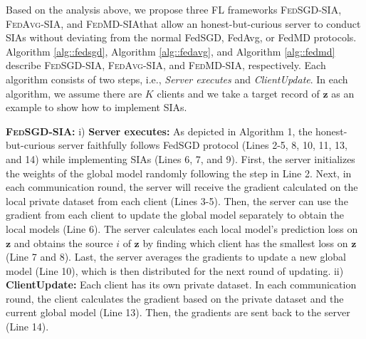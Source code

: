 \documentclass[10pt,journal,compsoc]{IEEEtran}
\newcommand*\fedavg{\textsc{FedAvg-SIA}}
\newcommand*\fedsgd{\textsc{FedSGD-SIA}}
\newcommand*\fedmd{\textsc{FedMD-SIA}}
\begin{document}
Based on the analysis above, we propose three FL frameworks \fedsgd, \fedavg, and \fedmd \;that allow an honest-but-curious server to conduct SIAs without deviating from the normal FedSGD, FedAvg, or FedMD protocols. 
Algorithm \ref{alg::fedsgd}, Algorithm \ref{alg::fedavg}, and Algorithm \ref{alg::fedmd} describe \fedsgd, \fedavg, and \fedmd, respectively. Each algorithm consists of two steps, {i.e.,} \textit{Server executes} and \textit{ClientUpdate}. In each algorithm, we assume there are $K$ clients and we take a target record of $\bm{z}$ as an example to show how to implement SIAs.


\noindent \textbf{\fedsgd: \;} i) \textbf{Server executes:} As depicted in Algorithm 1, the honest-but-curious server faithfully follows FedSGD protocol (Lines 2-5, 8, 10, 11, 13, and 14) while implementing SIAs (Lines 6, 7, and 9). First, the server initializes the weights of the global model randomly following the step in Line 2. Next, in each communication round, the server will receive the gradient calculated on the local private dataset from each client (Lines 3-5). Then, the server can use the gradient from each client to update the global model separately to obtain the local models (Line 6). The server calculates each local model's prediction loss on $\bm{z}$ and obtains the source $i$ of $\bm{z}$ by finding which client has the smallest loss on $\bm{z}$ (Line 7 and 8). Last, the server averages the gradients to update a new global model (Line 10), which is then distributed for the next round of updating. ii) \textbf{ClientUpdate:} Each client has its own private dataset. In each communication round, the client calculates the gradient based on the private dataset and the current global model (Line 13). Then, the gradients are sent back to the server (Line 14).
\end{document}
